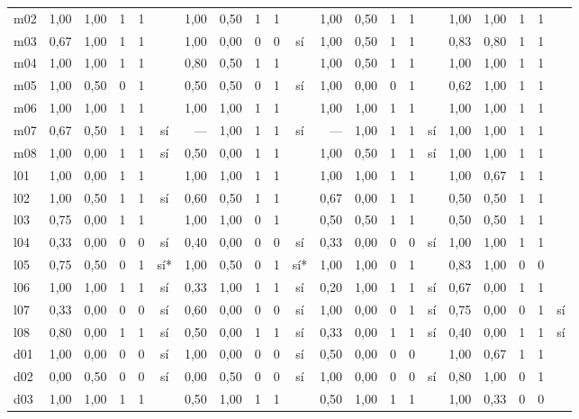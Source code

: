 \begin{scriptsize}
\begin{longtable}{@{}l rrrrc rrrrc rrrrc rrrrc@{}}
m02 & 1,00 & 1,00 & 1 & 1 &  & 1,00 & 0,50 & 1 & 1 &  & 1,00 & 0,50 & 1 & 1 &  & 1,00 & 1,00 & 1 & 1 &  \\
m03 & 0,67 & 1,00 & 1 & 1 &  & 1,00 & 0,00 & 0 & 0 & sí & 1,00 & 0,50 & 1 & 1 &  & 0,83 & 0,80 & 1 & 1 &  \\
m04 & 1,00 & 1,00 & 1 & 1 &  & 0,80 & 0,50 & 1 & 1 &  & 1,00 & 0,50 & 1 & 1 &  & 1,00 & 1,00 & 1 & 1 &  \\
m05 & 1,00 & 0,50 & 0 & 1 &  & 0,50 & 0,50 & 0 & 1 & sí & 1,00 & 0,00 & 0 & 1 &  & 0,62 & 1,00 & 1 & 1 &  \\
m06 & 1,00 & 1,00 & 1 & 1 &  & 1,00 & 1,00 & 1 & 1 &  & 1,00 & 1,00 & 1 & 1 &  & 1,00 & 1,00 & 1 & 1 &  \\
m07 & 0,67 & 0,50 & 1 & 1 & sí & --- & 1,00 & 1 & 1 & sí & --- & 1,00 & 1 & 1 & sí & 1,00 & 1,00 & 1 & 1 &  \\
m08 & 1,00 & 0,00 & 1 & 1 & sí & 0,50 & 0,00 & 1 & 1 &  & 1,00 & 0,50 & 1 & 1 & sí & 1,00 & 1,00 & 1 & 1 &  \\
l01 & 1,00 & 0,00 & 1 & 1 &  & 1,00 & 1,00 & 1 & 1 &  & 1,00 & 1,00 & 1 & 1 &  & 1,00 & 0,67 & 1 & 1 &  \\
l02 & 1,00 & 0,50 & 1 & 1 & sí & 0,60 & 0,50 & 1 & 1 &  & 0,67 & 0,00 & 1 & 1 &  & 0,50 & 0,50 & 1 & 1 &  \\
l03 & 0,75 & 0,00 & 1 & 1 &  & 1,00 & 1,00 & 0 & 1 &  & 0,50 & 0,50 & 1 & 1 &  & 0,50 & 0,50 & 1 & 1 &  \\
l04 & 0,33 & 0,00 & 0 & 0 & sí & 0,40 & 0,00 & 0 & 0 & sí & 0,33 & 0,00 & 0 & 0 & sí & 1,00 & 1,00 & 1 & 1 &  \\
l05 & 0,75 & 0,50 & 0 & 1 & sí* & 1,00 & 0,50 & 0 & 1 & sí* & 1,00 & 1,00 & 0 & 1 &  & 0,83 & 1,00 & 0 & 0 &  \\
l06 & 1,00 & 1,00 & 1 & 1 & sí & 0,33 & 1,00 & 1 & 1 & sí & 0,20 & 1,00 & 1 & 1 & sí & 0,67 & 0,00 & 1 & 1 &  \\
l07 & 0,33 & 0,00 & 0 & 0 & sí & 0,60 & 0,00 & 0 & 0 & sí & 1,00 & 0,00 & 0 & 1 & sí & 0,75 & 0,00 & 0 & 1 & sí \\
l08 & 0,80 & 0,00 & 1 & 1 & sí & 0,50 & 0,00 & 1 & 1 & sí & 0,33 & 0,00 & 1 & 1 & sí & 0,40 & 0,00 & 1 & 1 & sí \\
d01 & 1,00 & 0,00 & 0 & 0 & sí & 1,00 & 0,00 & 0 & 0 & sí & 0,50 & 0,00 & 0 & 0 &  & 1,00 & 0,67 & 1 & 1 &  \\
d02 & 0,00 & 0,50 & 0 & 0 & sí & 0,00 & 0,50 & 0 & 0 & sí & 1,00 & 0,00 & 0 & 0 & sí & 0,80 & 1,00 & 0 & 1 &  \\
d03 & 1,00 & 1,00 & 1 & 1 &  & 0,50 & 1,00 & 1 & 1 &  & 0,50 & 1,00 & 1 & 1 &  & 1,00 & 0,33 & 0 & 0 &  \\

\end{longtable}
\end{scriptsize}
